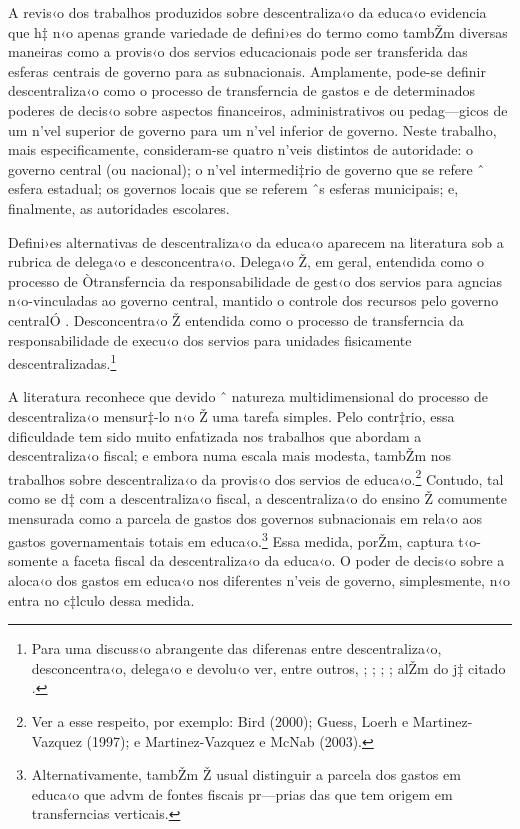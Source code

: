 \documentclass[a4paper, 12pt]{article}
\begin{document}
A revis‹o dos trabalhos produzidos sobre descentraliza‹o da educa‹o evidencia que h‡ n‹o apenas grande variedade de defini›es do termo como tambŽm diversas maneiras como a provis‹o dos servios educacionais pode ser transferida das esferas centrais de governo para as subnacionais. Amplamente, pode-se definir descentraliza‹o como o processo de transferncia de gastos e de determinados poderes de decis‹o sobre aspectos financeiros, administrativos ou pedag—gicos de um n’vel superior de governo para um n’vel inferior de governo. Neste trabalho, mais especificamente, consideram-se quatro n’veis distintos de autoridade: o governo central (ou nacional); o n’vel intermedi‡rio de governo que se refere ˆ esfera estadual; os governos locais que se referem ˆs esferas municipais; e, finalmente, as autoridades escolares.

Defini›es alternativas de descentraliza‹o da educa‹o aparecem na literatura sob a rubrica de delega‹o e desconcentra‹o. Delega‹o Ž, em geral, entendida como o processo de Òtransferncia da responsabilidade de gest‹o dos servios para agncias n‹o-vinculadas ao governo central, mantido o controle dos recursos pelo governo centralÓ \cite{arretche_mitos_1996}. Desconcentra‹o Ž entendida como o processo de transferncia da responsabilidade de execu‹o dos servios para unidades fisicamente descentralizadas.\footnote{Para uma discuss‹o abrangente das diferenas entre descentraliza‹o, desconcentra‹o, delega‹o e devolu‹o ver, entre outros, \cite{fiske_decentralization_1996}; \cite{guess_fiscal_1997}; \cite{welsh_decentralization_1999}; \cite{hanson_educational_1997}; alŽm do j‡ citado \cite{arretche_mitos_1996}.}

A literatura reconhece que devido ˆ natureza multidimensional do processo de descentraliza‹o mensur‡-lo n‹o Ž uma tarefa simples. Pelo contr‡rio, essa dificuldade tem sido muito enfatizada nos trabalhos que abordam a descentraliza‹o fiscal; e embora numa escala mais modesta, tambŽm nos trabalhos sobre descentraliza‹o da provis‹o dos servios de educa‹o.\footnote{Ver a esse respeito, por exemplo: Bird (2000); Guess, Loerh e Martinez-Vazquez (1997); e Martinez-Vazquez e McNab (2003).} Contudo, tal como se d‡ com a descentraliza‹o fiscal, a descentraliza‹o do ensino Ž comumente mensurada como a parcela de gastos dos governos subnacionais em rela‹o aos gastos governamentais totais em educa‹o.\footnote{Alternativamente, tambŽm Ž usual distinguir a parcela dos gastos em educa‹o que advm de fontes fiscais pr—prias das que tem origem em transferncias verticais.} Essa medida, porŽm, captura t‹o-somente a faceta fiscal da descentraliza‹o da educa‹o. O poder de decis‹o sobre a aloca‹o dos gastos em educa‹o nos diferentes n’veis de governo, simplesmente, n‹o entra no c‡lculo dessa medida.
\end{document}
